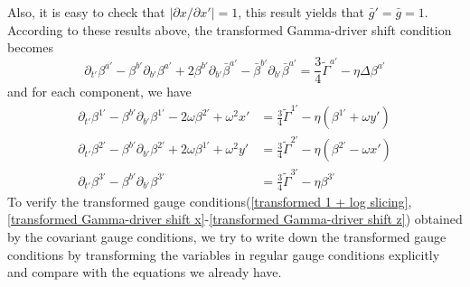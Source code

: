 Also, it is easy to check that $\left|\partial x/\partial x'\right| = 1$, this result yields that ${\bar g}' = {\bar g} = 1$. According to these results above, the transformed Gamma-driver shift condition becomes
\begin{equation}
\partial_{t'}\beta^{a'} - \beta^{b'}\partial_{b'}\beta^{a'} + 2\beta^{b'}\partial_{b'}{\bar \beta}^{a'} - {\bar \beta}^{b'}\partial_{b'}{\bar \beta}^{a'} = \frac{3}{4}{\tilde \Gamma}^{a'} - \eta \Delta \beta^{a'}
\end{equation}
and for each component, we have
\begin{align}
\partial_{t'}\beta^{1'} - \beta^{b'}\partial_{b'}\beta^{1'} - 2\omega\beta^{2'} + \omega^{2}x' &= \frac{3}{4}{\tilde \Gamma}^{1'} - \eta \left(\beta^{1'} + \omega y'\right)\label{transformed Gamma-driver shift x}\\
\partial_{t'}\beta^{2'} - \beta^{b'}\partial_{b'}\beta^{2'} + 2\omega\beta^{1'} + \omega^{2}y' &= \frac{3}{4}{\tilde \Gamma}^{2'} - \eta \left(\beta^{2'} - \omega x'\right)\label{transformed Gamma-driver shift y}\\
\partial_{t'}\beta^{3'} - \beta^{b'}\partial_{b'}\beta^{3'} & = \frac{3}{4}{\tilde \Gamma}^{3'} - \eta \beta^{3'}\label{transformed Gamma-driver shift z}
\end{align}
To verify the transformed gauge conditions(\ref{transformed 1 + log slicing}, \ref{transformed Gamma-driver shift x}-\ref{transformed Gamma-driver shift z}) obtained by the covariant gauge conditions, we try to write down the transformed gauge conditions by transforming the variables in regular gauge conditions explicitly and compare with the equations we already have. 

